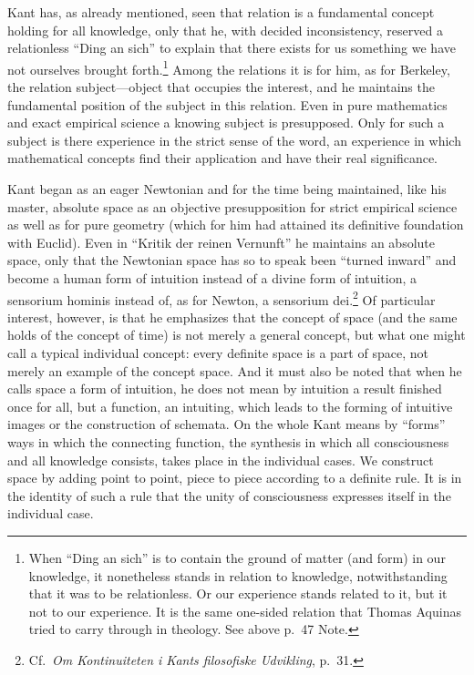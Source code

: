 \documentclass[12pt]{article}
\newcommand{\opage}[1]{\marginnote{\footnotesize\textit{[#1]}}}
\begin{document}
Kant has, as already mentioned, seen that relation is a fundamental concept
holding for all knowledge, only that he, with decided inconsistency,
reserved a relationless ``Ding an sich'' to explain that there exists for us
something we have not ourselves brought forth.\footnote{When ``Ding an
sich'' is to contain the ground of matter (and form) in our knowledge, it
nonetheless stands in relation to knowledge, notwithstanding that it was to
be relationless. Or our experience stands related to it, but it not to our
experience. It is the same one-sided relation that Thomas Aquinas tried to
carry through in theology. See above p.~47 Note.} Among the relations \opage{69}it is
for him, as for Berkeley, the relation subject---object that occupies the
interest, and he maintains the fundamental position of the subject in this
relation. Even in pure mathematics and exact empirical science a knowing
subject is presupposed. Only for such a subject is there experience in the
strict sense of the word, an experience in which mathematical concepts find
their application and have their real significance.

Kant began as an eager Newtonian and for the time being maintained, like his
master, absolute space as an objective presupposition for strict empirical
science as well as for pure geometry (which for him had attained its
definitive foundation with Euclid). Even in ``Kritik der reinen Vernunft''
he maintains an absolute space, only that the Newtonian space has so to
speak been ``turned inward'' and become a human form of intuition instead of
a divine form of intuition, a sensorium hominis instead of, as for Newton, a
sensorium dei.\footnote{Cf.\ \textit{Om Kontinuiteten i Kants filosofiske
Udvikling}, p.~31.} Of particular interest, however, is that he emphasizes
that the concept of space (and the same holds of the concept of time) is not
merely a general concept, but what one might call a typical individual
concept: every definite space is a part of space, not merely an example of
the concept space. And it must also be noted that when he calls space a form
of intuition, he does not mean by intuition a result finished once for all,
but a function, an intuiting, which leads to the forming of intuitive images
or the construction of schemata. On the whole Kant means by ``forms'' ways
in which the connecting function, the \opage{70}synthesis in which all consciousness
and all knowledge consists, takes place in the individual cases. We
construct space by adding point to point, piece to piece according to a
definite rule. It is in the identity of such a rule that the unity of
consciousness expresses itself in the individual case.
\end{document}
